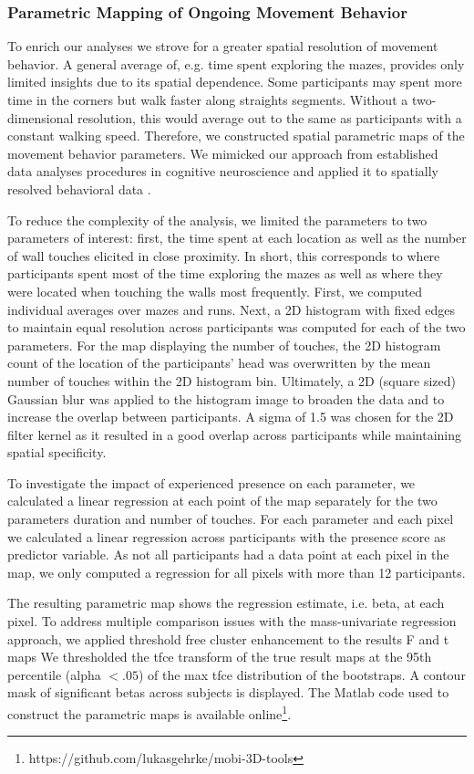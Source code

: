 \subsubsection{Parametric Mapping of Ongoing Movement Behavior} To enrich our analyses we strove for a greater spatial resolution of movement behavior. A general average of, e.g. time spent exploring the mazes, provides only limited insights due to its spatial dependence. Some participants may spent more time in the corners but walk faster along straights segments. Without a two-dimensional resolution, this would average out to the same as participants with a constant walking speed. Therefore, we constructed spatial parametric maps of the movement behavior parameters. We mimicked our approach from established data analyses procedures in cognitive neuroscience and applied it to spatially resolved behavioral data \cite{Friston1994, Bridwell2018a}.

To reduce the complexity of the analysis, we limited the parameters to two parameters of interest: first, the time spent at each location as well as the number of wall touches elicited in close proximity. In short, this corresponds to where participants spent most of the time exploring the mazes as well as where they were located when touching the walls most frequently. First, we computed individual averages over mazes and runs. Next, a 2D histogram with fixed edges to maintain equal resolution across participants was computed for each of the two parameters. For the map displaying the number of touches, the 2D histogram count of the location of the participants' head was overwritten by the mean number of touches within the 2D histogram bin. Ultimately, a 2D (square sized) Gaussian blur was applied to the histogram image to broaden the data and to increase the overlap between participants. A sigma of 1.5 was chosen for the 2D filter kernel as it resulted in a good overlap across participants while maintaining spatial specificity.

To investigate the impact of experienced presence on each parameter, we calculated a linear regression at each point of the map separately for the two parameters duration and number of touches. For each parameter and each pixel we calculated a linear regression across participants with the presence score as predictor variable. As not all participants had a data point at each pixel in the map, we only computed a regression for all pixels with more than 12 participants.

The resulting parametric map shows the regression estimate, i.e. beta, at each pixel. To address multiple comparison issues with the mass-univariate regression approach, we applied threshold free cluster enhancement to the results F and t maps %
We thresholded the tfce transform of the true result maps at the 95th percentile (alpha $< .05$) of the max tfce distribution of the bootstraps. A contour mask of significant betas across subjects is displayed. The Matlab code used to construct the parametric maps is available online\footnote{https://github.com/lukasgehrke/mobi-3D-tools}.